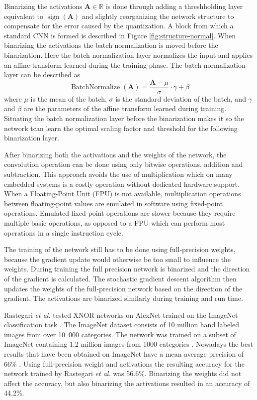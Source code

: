 \documentclass[conference]{IEEEtran}
\DeclareMathOperator{\sign}{sign}
\DeclareMathOperator{\bn}{BatchNormalize}
\begin{document}
Binarizing the activations $\mathbf{A}\in\mathbb{R}$ is done through adding a threshholding layer equivalent to $\sign(\mathbf{A})$ and slightly reorganizing the network structure to compensate for the error caused by the quantization. A block from which a standard CNN is formed is described in Figure \ref{fig:structure-normal}. When binarizing the activations the batch normalization is moved before the binarization. Here the batch normalization layer normalizes the input and applies an affine transform learned during the training phase. The batch normalization layer can be described as
\begin{equation}
\bn(\mathbf{A}) = \frac{\mathbf{A}-\mu}{\sigma}\cdot\gamma + \beta
\label{eq:bn-matrix}
\end{equation}
where $\mu$ is the mean of the batch, $\sigma$ is the standard deviation of the batch, and $\gamma$ and $\beta$ are the parameters of the affine transform learned during training. Situating the batch normalization layer before the binarization makes it so the network tcan learn the optimal scaling factor and threshold for the following binarization layer.

After binarizing both the activations and the weights of the network, the convolution operation can be done using only bitwise operations, addition and subtraction. This approach avoids the use of multiplication which on many embedded systems is a costly operation without dedicated hardware support. When a Floating-Point Unit (FPU) is not available, multiplication operations between floating-point values are emulated in software using fixed-point operations. Emulated fixed-point operations are slower because they require multiple basic operations, as opposed to a FPU which can perform most operations in a single instruction cycle.

The training of the network still has to be done using full-precision weights, because the gradient update would otherwise be too small to influence the weights. During training the full precision network is binarized and the direction of the gradient is calculated. The stochastic gradient descent algorithm then updates the weights of the full-precision network based on the direction of the gradient. The activations are binarized similarly during training and run time.

Rastegari \textit{et al.} tested XNOR networks on AlexNet trained on the ImageNet classification task \cite{xnor}. The ImageNet dataset consists of 10 million hand labeled images from over \mbox{10 000} categories. The network was trained on a subset of ImageNet containing 1.2 million images from 1000 categories \cite{imagenet}. Nowadays the best results that have been obtained on ImageNet have a mean average precision of 66\% \cite{imagenet-res}. Using full-precision weight and activations the resulting accuracy for the network trained by Rastegari \textit{et al.} was 56.6\%. Binarizing the weights did not affect the accuracy, but also binarizing the activations resulted in an accuracy of 44.2\%. \cite{xnor}
\end{document}
